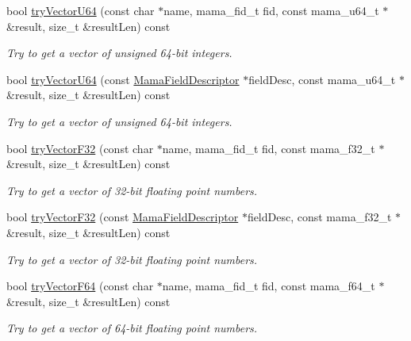\begin{DoxyCompactItemize}
bool \hyperlink{classWombat_1_1MamaMsg_a7a4e9494bf81aa6c415b4387b0fa662b}{tryVectorU64} (const char $\ast$name, mama\_\-fid\_\-t fid, const mama\_\-u64\_\-t $\ast$\&result, size\_\-t \&resultLen) const 
\begin{DoxyCompactList}\small\item\em Try to get a vector of unsigned 64-\/bit integers. \item\end{DoxyCompactList}\item 
bool \hyperlink{classWombat_1_1MamaMsg_a48a026a5dd78f1bc11202a7f1827a8f5}{tryVectorU64} (const \hyperlink{classWombat_1_1MamaFieldDescriptor}{MamaFieldDescriptor} $\ast$fieldDesc, const mama\_\-u64\_\-t $\ast$\&result, size\_\-t \&resultLen) const 
\begin{DoxyCompactList}\small\item\em Try to get a vector of unsigned 64-\/bit integers. \item\end{DoxyCompactList}\item 
bool \hyperlink{classWombat_1_1MamaMsg_aa2177d08e01fbad486659f167b6ac1aa}{tryVectorF32} (const char $\ast$name, mama\_\-fid\_\-t fid, const mama\_\-f32\_\-t $\ast$\&result, size\_\-t \&resultLen) const 
\begin{DoxyCompactList}\small\item\em Try to get a vector of 32-\/bit floating point numbers. \item\end{DoxyCompactList}\item 
bool \hyperlink{classWombat_1_1MamaMsg_acdc51528232649cf901eab7dc845c976}{tryVectorF32} (const \hyperlink{classWombat_1_1MamaFieldDescriptor}{MamaFieldDescriptor} $\ast$fieldDesc, const mama\_\-f32\_\-t $\ast$\&result, size\_\-t \&resultLen) const 
\begin{DoxyCompactList}\small\item\em Try to get a vector of 32-\/bit floating point numbers. \item\end{DoxyCompactList}\item 
bool \hyperlink{classWombat_1_1MamaMsg_a9203766d9f47ded07e047091ba4073b7}{tryVectorF64} (const char $\ast$name, mama\_\-fid\_\-t fid, const mama\_\-f64\_\-t $\ast$\&result, size\_\-t \&resultLen) const 
\begin{DoxyCompactList}\small\item\em Try to get a vector of 64-\/bit floating point numbers. \item\end{DoxyCompactList}\item 

\end{DoxyCompactItemize}
